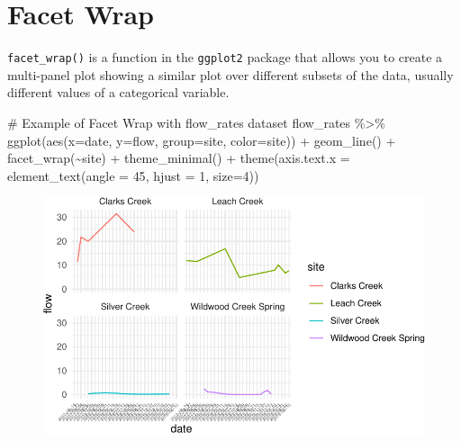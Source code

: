 \documentclass[
  letterpaper,
  DIV=11,
  numbers=noendperiod]{scrartcl}
\newenvironment{Shaded}{\begin{snugshade}}{\end{snugshade}}
\newcommand{\AttributeTok}[1]{\textcolor[rgb]{0.40,0.45,0.13}{#1}}
\newcommand{\CommentTok}[1]{\textcolor[rgb]{0.37,0.37,0.37}{#1}}
\newcommand{\DecValTok}[1]{\textcolor[rgb]{0.68,0.00,0.00}{#1}}
\newcommand{\FunctionTok}[1]{\textcolor[rgb]{0.28,0.35,0.67}{#1}}
\newcommand{\NormalTok}[1]{\textcolor[rgb]{0.00,0.23,0.31}{#1}}
\newcommand{\SpecialCharTok}[1]{\textcolor[rgb]{0.37,0.37,0.37}{#1}}
\begin{document}
\hypertarget{facet-wrap}{%
\section{Facet Wrap}\label{facet-wrap}}

\texttt{facet\_wrap()} is a function in the \texttt{ggplot2} package
that allows you to create a multi-panel plot showing a similar plot over
different subsets of the data, usually different values of a categorical
variable.

\begin{Shaded}
\begin{Highlighting}[]
\CommentTok{\# Example of Facet Wrap with \textasciigrave{}flow\_rates\textasciigrave{} dataset}
\NormalTok{flow\_rates }\SpecialCharTok{\%\textgreater{}\%} 
  \FunctionTok{ggplot}\NormalTok{(}\FunctionTok{aes}\NormalTok{(}\AttributeTok{x=}\NormalTok{date, }\AttributeTok{y=}\NormalTok{flow, }\AttributeTok{group=}\NormalTok{site, }\AttributeTok{color=}\NormalTok{site)) }\SpecialCharTok{+} 
  \FunctionTok{geom\_line}\NormalTok{() }\SpecialCharTok{+} 
  \FunctionTok{facet\_wrap}\NormalTok{(}\SpecialCharTok{\textasciitilde{}}\NormalTok{site) }\SpecialCharTok{+}
  \FunctionTok{theme\_minimal}\NormalTok{() }\SpecialCharTok{+}
  \FunctionTok{theme}\NormalTok{(}\AttributeTok{axis.text.x =} \FunctionTok{element\_text}\NormalTok{(}\AttributeTok{angle =} \DecValTok{45}\NormalTok{, }\AttributeTok{hjust =} \DecValTok{1}\NormalTok{, }\AttributeTok{size=}\DecValTok{4}\NormalTok{))}
\end{Highlighting}
\end{Shaded}

\begin{figure}[H]

{\centering \includegraphics{118_F_ggplot2_files/figure-pdf/unnamed-chunk-11-1.pdf}

}

\end{figure}
\end{document}
